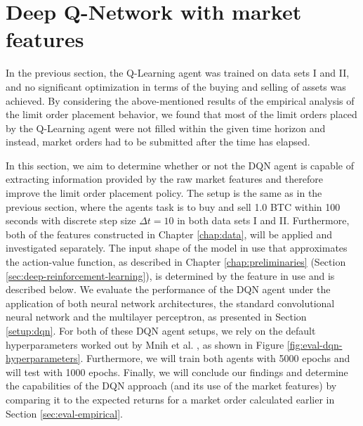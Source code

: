 \section{Deep Q-Network with market features}
\label{sec:eval-dqn}
In the previous section, the Q-Learning agent was trained on data sets I and II, and no significant optimization in terms of the buying and selling of assets was achieved.
By considering the above-mentioned results of the empirical analysis of the limit order placement behavior, we found that most of the limit orders placed by the Q-Learning agent were not filled within the given time horizon and instead, market orders had to be submitted after the time has elapsed.

In this section, we aim to determine whether or not the DQN agent is capable of extracting information provided by the raw market features and therefore improve the limit order placement policy.
The setup is the same as in the previous section, where the agents task is to buy and sell 1.0 BTC within 100 seconds with discrete step size $\Delta{t}=10$ in both data sets I and II.
Furthermore, both of the features constructed in Chapter \ref{chap:data}, will be applied and investigated separately.
The input shape of the model in use that approximates the action-value function, as described in Chapter \ref{chap:preliminaries} (Section \ref{sec:deep-reinforcement-learning}), is determined by the feature in use and is described below.
We evaluate the performance of the DQN agent under the application of both neural network architectures, the standard convolutional neural network and the multilayer perceptron, as presented in Section \ref{setup:dqn}.
For both of these DQN agent setups, we rely on the default hyperparameters worked out by Mnih et al. \cite{mnih2015human}, as shown in Figure \ref{fig:eval-dqn-hyperparameters}.
Furthermore, we will train both agents with 5000 epochs and will test with 1000 epochs.
Finally, we will conclude our findings and determine the capabilities of the DQN approach (and its use of the market features) by comparing it to the expected returns for a market order calculated earlier in Section \ref{sec:eval-empirical}.

